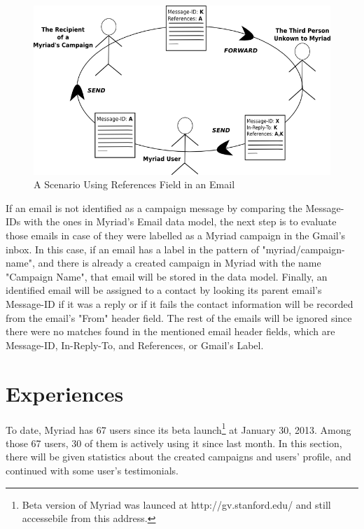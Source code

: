 \begin{figure}[htbp]
	\centering
	\includegraphics[width=1.00\textwidth]{imgs/drawingMessageReferences.png}
	\caption[A Scenario Using References Field in an Email]{A Scenario Using References Field in an Email}
	\label{fig:drawingMessageReferences}
\end{figure}

If an email is not identified as a campaign message by comparing the Message-IDs with the ones in Myriad's Email data model, the next step is to evaluate those emails in case of they were labelled as a Myriad campaign in the Gmail's inbox. In this case, if an email has a label in the pattern of "myriad/campaign-name", and there is already a created campaign in Myriad with the name "Campaign Name", that email will be stored in the data model. Finally, an identified email will be assigned to a contact by looking its parent email's Message-ID if it was a reply or if it fails the contact information will be recorded from the email's "From" header field. The rest of the emails will be ignored since there were no matches found in the mentioned email header fields, which are Message-ID, In-Reply-To, and References, or Gmail's Label.

\section{Experiences}
\label{sec:5.4:Expr}

To date, Myriad has 67 users since its beta launch\footnote{Beta version of Myriad was launced at http://gv.stanford.edu/ and still accessebile from this address.} at January 30, 2013. Among those 67 users, 30 of them is actively using it since last month. In this section, there will be given statistics about the created campaigns and users' profile, and continued with some user's testimonials.

